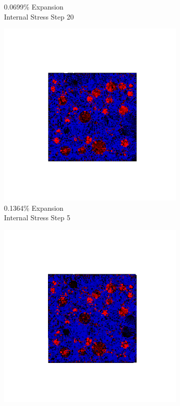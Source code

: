 \begin{figure}[ht!]
\begin{subfigure}{.25\textwidth}
      \caption{0.0699\% Expansion\\Internal Stress Step 20}
    \end{subfigure}
    \begin{subfigure}{.25\textwidth}
      \centering
      \includegraphics[width=1.0\linewidth]{Files/exp_3D/ASR/A15P75_2_s5.png}
      \caption{0.1364\% Expansion\\Internal Stress Step 5}
    \end{subfigure}%
    \begin{subfigure}{.25\textwidth}
      \centering
      \includegraphics[width=1.0\linewidth]{Files/exp_3D/ASR/A15P75_2_s10.png}

\end{subfigure}
\end{figure}
